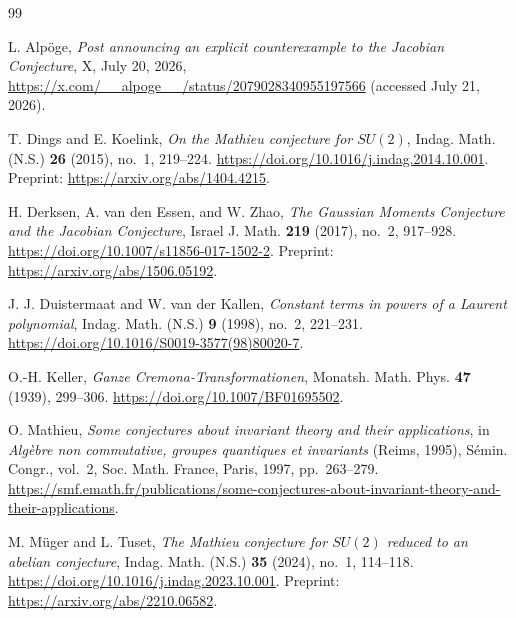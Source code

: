 \documentclass[11pt]{article}
\theoremstyle{remark}
\begin{document}
\begin{thebibliography}{99}

L. Alp\"oge,
\emph{Post announcing an explicit counterexample to the Jacobian Conjecture},
X, July 20, 2026,
\url{https://x.com/__alpoge__/status/2079028340955197566}
(accessed July 21, 2026).

T. Dings and E. Koelink,
\emph{On the Mathieu conjecture for $SU(2)$},
Indag. Math. (N.S.) \textbf{26} (2015), no.~1, 219--224.
\url{https://doi.org/10.1016/j.indag.2014.10.001}.
Preprint: \url{https://arxiv.org/abs/1404.4215}.

H. Derksen, A. van den Essen, and W. Zhao,
\emph{The Gaussian Moments Conjecture and the Jacobian Conjecture},
Israel J. Math. \textbf{219} (2017), no.~2, 917--928.
\url{https://doi.org/10.1007/s11856-017-1502-2}.
Preprint: \url{https://arxiv.org/abs/1506.05192}.

J. J. Duistermaat and W. van der Kallen,
\emph{Constant terms in powers of a Laurent polynomial},
Indag. Math. (N.S.) \textbf{9} (1998), no.~2, 221--231.
\url{https://doi.org/10.1016/S0019-3577(98)80020-7}.

O.-H. Keller,
\emph{Ganze Cremona-Transformationen},
Monatsh. Math. Phys. \textbf{47} (1939), 299--306.
\url{https://doi.org/10.1007/BF01695502}.

O. Mathieu,
\emph{Some conjectures about invariant theory and their applications},
in \emph{Alg\`ebre non commutative, groupes quantiques et invariants}
(Reims, 1995), S\'emin. Congr., vol.~2,
Soc. Math. France, Paris, 1997, pp.~263--279.
\url{https://smf.emath.fr/publications/some-conjectures-about-invariant-theory-and-their-applications}.

M. M\"uger and L. Tuset,
\emph{The Mathieu conjecture for $SU(2)$ reduced to an abelian conjecture},
Indag. Math. (N.S.) \textbf{35} (2024), no.~1, 114--118.
\url{https://doi.org/10.1016/j.indag.2023.10.001}.
Preprint: \url{https://arxiv.org/abs/2210.06582}.

\end{thebibliography}
\end{document}

